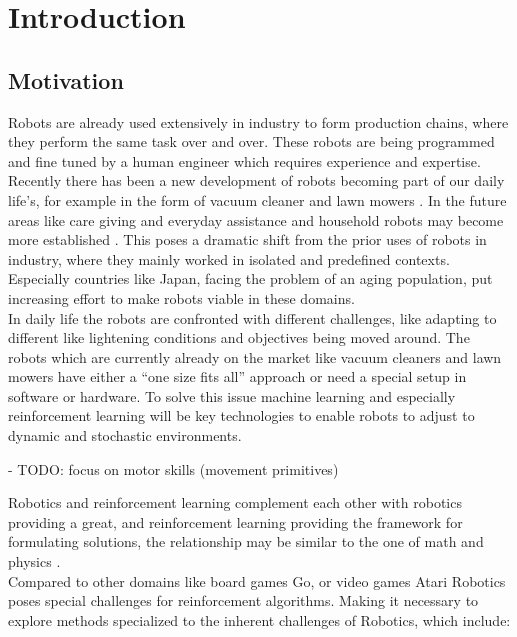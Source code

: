 
\chapter{Introduction}

\section{Motivation}
Robots are already used extensively in industry to form production chains,
where they perform the same task over and over.
These robots are being programmed and fine tuned
by a human engineer which requires experience and expertise. \\
Recently there has been a new development of robots
becoming part of our daily life's, for example in the form of 
vacuum cleaner and lawn mowers . In the future areas like care giving and
everyday assistance and household robots may
become more established \citet{schaal2007new}.
This poses a dramatic shift from the prior uses of robots in industry, where
they mainly worked in isolated and predefined contexts.
Especially countries like Japan, facing the problem of an
aging population, put increasing effort to make robots
viable in these domains.  \\
In daily life the robots are confronted with different challenges,
like  adapting to different like lightening conditions and
objectives being moved around.
The robots which are currently already on the market
like vacuum cleaners and lawn mowers have
either a ``one size fits all'' approach or need a special setup
in software or hardware. To solve this issue
machine learning and especially
reinforcement learning will be key technologies to enable robots
to adjust to dynamic and stochastic environments.

- TODO: focus on motor skills (movement primitives)

Robotics and reinforcement learning complement each other
with robotics providing a great, and reinforcement learning providing
the framework for formulating solutions, the 
relationship may be similar to the one of  math and physics
\citet{kober2013reinforcement}. \\
Compared to other domains like board games Go, or video games Atari
Robotics  poses special challenges for reinforcement algorithms. Making
it necessary to explore methods specialized to the inherent
challenges of Robotics, which include:

